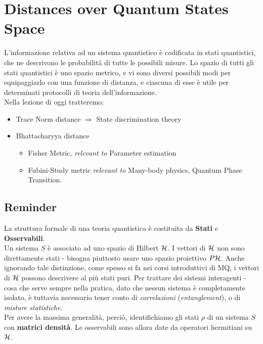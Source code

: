 \documentclass[../../InformazioneQuantistica.tex]{subfiles}
\begin{document}
\section{Distances over Quantum States Space}
L'informazione relativa ad un sistema quantistico è codificata in stati quantistici, che ne descrivono le probabilità di tutte le possibili misure. Lo spazio di tutti gli stati quantistici è uno spazio metrico, e vi sono diversi possibili modi per equipaggiarlo con una funzione di distanza, e ciascuna di esse è utile per determinati protocolli di teoria dell'informazione.\\
Nella lezione di oggi tratteremo:
\begin{itemize}
\item Trace Norm distance $\Rightarrow$ State discrimination theory
\item Bhattacharyya distance
\begin{itemize}
\item Fisher Metric, \textit{relevant to} Parameter estimation
\item Fubini-Study metric \textit{relevant to} Many-body physics, Quantum Phase Transition. 
\end{itemize}
\end{itemize}

\subsection{Reminder}
La struttura formale di una teoria quantistica è costituita da \textbf{Stati} e \textbf{Osservabili}.\\
Un sistema $S$ è associato ad uno spazio di Hilbert $\mathcal{H}$. I vettori di $\mathcal{H}$ non sono direttamente stati - bisogna piuttosto usare uno spazio proiettivo $P\mathcal{H}$. Anche ignorando tale distinzione, come spesso si fa nei corsi introduttivi di MQ, i vettori di $\mathcal{H}$ possono descrivere al più stati puri. Per trattare dei sistemi interagenti - cosa che serve sempre nella pratica, dato che nessun sistema è completamente isolato, è tuttavia necessario tener conto di \textit{correlazioni} (\textit{entanglement}), o di \textit{misture statistiche}.\\
Per avere la massima generalità, perciò, identifichiamo gli stati $\rho$ di un sistema $S$ con \textbf{matrici densità}. Le osservabili sono allora date da operatori hermitiani su $\mathcal{H}$.\\
\end{document}
